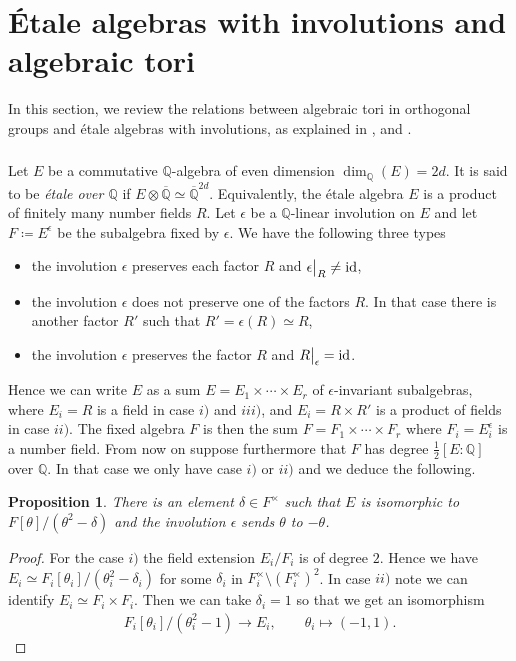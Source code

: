 \documentclass[11pt]{article} %
\newcommand{\8}{\infty}
\newcommand{\idrm}{\mathrm{id}}
\newcommand{\Qbar}{\overline{\Q}}
\newcommand{\Q}{\mathbb{Q}}
\newcommand\restr[2]{{%
  \left.\kern-\nulldelimiterspace %
  #1 %
  \vphantom{\big|} %
  \right|_{#2} %
  }}
\theoremstyle{mytheoremstyle}
\newtheorem{prop}[thm]{Proposition}
\theoremstyle{remark}
\numberwithin{equation}{section}
\begin{document}
\section{\'Etale algebras with involutions and algebraic tori} \label{etale}

In this section, we review the relations between algebraic tori in orthogonal groups and \'etale algebras with involutions, as explained in \cite{maxtor1}, \cite{maxtor2} and \cite{dgl}.

\subsubsection{} Let $E$ be a commutative $\Q$-algebra of even dimension $\dim_\Q(E)=2d$. It is said to be {\em \'etale over $\Q$} if $E \otimes \Qbar \simeq \Qbar^{2d}$. Equivalently, the \'etale algebra $E$ is a product of finitely many number fields $R$.  Let $\epsilon$ be a $\Q$-linear involution on $E$ and let $F \coloneqq E^\epsilon$ be the subalgebra fixed by $\epsilon$. We have the following three types 
\begin{itemize}
\item[$i)$] the involution $\epsilon$ preserves { each factor $R$ and $\restr{\epsilon}{R}\neq\idrm$},
\item[$ii)$] the involution $\epsilon$ does not preserve { one of the factors} $R$. In that case there is another factor $R'$ such that $R'=\epsilon(R) \simeq R$,
\item[$iii)$] the involution $\epsilon$ preserves the factor $R$ and $\restr{R}{\epsilon}=\idrm$.
\end{itemize}
Hence we can write $E$ as a sum $E=E_1 \times \cdots \times E_r$ of $\epsilon$-invariant subalgebras, where $E_i=R$ is a field in case $i)$ and $iii)$, and $E_i=R \times R'$ is a product of fields in case $ii)$. The fixed algebra $F$ is then the sum $F=F_1 \times \cdots \times F_r$ where $F_i=E_i^\epsilon$ is a number field.
From now on suppose furthermore that $F$ has degree $\frac{1}{2}[E\colon \Q]$ over $\Q$. In that case we only have case $i)$ or $ii)$ and we deduce the following.
\begin{prop}
There is an element $\delta \in F^\times$ such that $E$ is isomorphic to $F[\theta]/(\theta^2-\delta)$ and the involution $\epsilon$ sends $\theta$ to $-\theta$.
\end{prop}
\begin{proof}
    For the case $i)$ the field extension $E_i/F_i$ is of degree $2$. Hence we have $E_i \simeq F_i[\theta_i]/(\theta_i^2-\delta_i)$ for some $\delta_i$ in $F_i^\times \setminus (F_i^\times)^2$. In case $ii)$ note we can identify $E_i \simeq F_i \times F_i$. Then we can take $\delta_i=1$ so that we get an isomorphism
    \begin{align}
    F_i[\theta_i]/(\theta_i^2-1) \longrightarrow E_i, \qquad
    \theta_i \longmapsto (-1,1).
    \end{align}
\end{proof}
\end{document}
